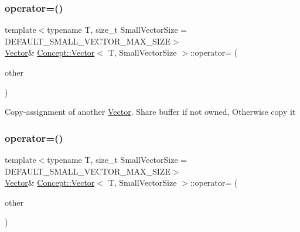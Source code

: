 \subsubsection{\texorpdfstring{operator=()}{operator=()}\hspace{0.1cm}{\footnotesize\ttfamily [1/2]}}
{\footnotesize\ttfamily template$<$typename T, size\+\_\+t Small\+Vector\+Size = D\+E\+F\+A\+U\+L\+T\+\_\+\+S\+M\+A\+L\+L\+\_\+\+V\+E\+C\+T\+O\+R\+\_\+\+M\+A\+X\+\_\+\+S\+I\+ZE$>$ \\
\mbox{\hyperlink{class_concept_1_1_vector}{Vector}}\& \mbox{\hyperlink{class_concept_1_1_vector}{Concept\+::\+Vector}}$<$ T, Small\+Vector\+Size $>$\+::operator= (\begin{DoxyParamCaption}\item[{const \mbox{\hyperlink{class_concept_1_1_vector}{Vector}}$<$ T, Small\+Vector\+Size $>$ \&}]{other }\end{DoxyParamCaption})\hspace{0.3cm}{\ttfamily [inline]}}

Copy-\/assignment of another \mbox{\hyperlink{class_concept_1_1_vector}{Vector}}. Share buffer if not owned, Otherwise copy it \mbox{\label{class_concept_1_1_vector_a3a30dc7360a5e0a94a80fe760446690c}} 
\subsubsection{\texorpdfstring{operator=()}{operator=()}\hspace{0.1cm}{\footnotesize\ttfamily [2/2]}}
{\footnotesize\ttfamily template$<$typename T, size\+\_\+t Small\+Vector\+Size = D\+E\+F\+A\+U\+L\+T\+\_\+\+S\+M\+A\+L\+L\+\_\+\+V\+E\+C\+T\+O\+R\+\_\+\+M\+A\+X\+\_\+\+S\+I\+ZE$>$ \\
\mbox{\hyperlink{class_concept_1_1_vector}{Vector}}\& \mbox{\hyperlink{class_concept_1_1_vector}{Concept\+::\+Vector}}$<$ T, Small\+Vector\+Size $>$\+::operator= (\begin{DoxyParamCaption}\item[{\mbox{\hyperlink{class_concept_1_1_vector}{Vector}}$<$ T, Small\+Vector\+Size $>$ \&\&}]{other }\end{DoxyParamCaption})\hspace{0.3cm}{\ttfamily [inline]}}

